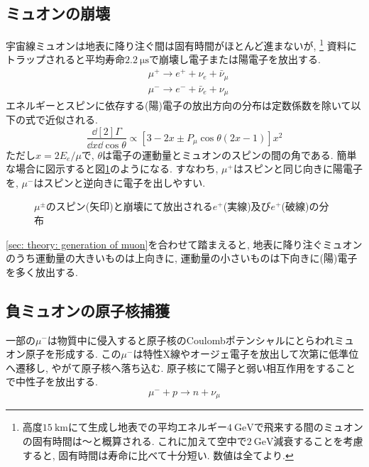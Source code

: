 \documentclass[dvipdfmx]{jsarticle}
\begin{document}
\subsection{ミュオンの崩壊}
\label{sec: theory: decay of muon}

宇宙線ミュオンは地表に降り注ぐ間は固有時間がほとんど進まないが,
\footnote{
    高度$\SI{15}{\km}$にて生成し地表での平均エネルギー$\SI{4}{\GeV}$で飛来する間のミュオンの固有時間は〜と概算される.
    これに加えて空中で$\SI{2}{\GeV}$減衰することを考慮すると, 固有時間は寿命に比べて十分短い.
    数値は全て\cite{PDG}より.
}
資料にトラップされると平均寿命$\SI{2.2}{\micro\second}$で崩壊し電子または陽電子を放出する.
\begin{align*}
    &\mu^+\to e^++\nu_e+\bar{\nu}_\mu
    \\
    &\mu^-\to e^-+\bar{\nu}_e+\nu_\mu
\end{align*}
エネルギーとスピンに依存する(陽)電子の放出方向の分布は定数係数を除いて以下の式で近似される\cite{PDG}.
\begin{equation*}
    \frac{\dd[2]{\Gamma}}{\dd{x}\dd{\cos\theta}}
    \propto
    [3-2x\pm P_\mu\cos\theta(2x-1)]x^2
\end{equation*}
ただし$x=2E_e/\mu$で, $\theta$は電子の運動量とミュオンのスピンの間の角である.
簡単な場合に図示すると図\ref{fig: muon decay distrib.}のようになる.
すなわち, $\mu^+$はスピンと同じ向きに陽電子を, $\mu^-$はスピンと逆向きに電子を出しやすい.

\begin{figure}
    \centering
    
    \caption{$\mu^\pm$のスピン(矢印)と崩壊にて放出される$e^+$(実線)及び$e^+$(破線)の分布}
    \label{fig: muon decay distrib.}
\end{figure}

\ref{sec: theory: generation of muon}を合わせて踏まえると, 地表に降り注ぐミュオンのうち運動量の大きいものは上向きに, 運動量の小さいものは下向きに(陽)電子を多く放出する.


\subsection{負ミュオンの原子核捕獲}
\label{sec: theory: negative muon capture}

一部の$\mu^-$は物質中に侵入すると原子核のCoulombポテンシャルにとらわれミュオン原子を形成する.
この$\mu^-$は特性X線やオージェ電子を放出して次第に低準位へ遷移し, やがて原子核へ落ち込む.
原子核にて陽子と弱い相互作用をすることで中性子を放出する.
\begin{equation*}
    \mu^-+p\to n+\nu_\mu
\end{equation*}
\end{document}
